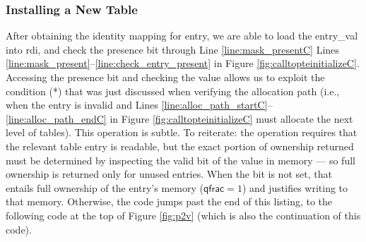  \subsubsection{Installing a New Table}
 After obtaining the identity mapping for \textsf{entry}, we are able to load the \textsf{entry\_val} into \textsf{rdi}, and check the presence bit through
\ifPLDI
Line \ref{line:mask_presentC} %
\else
Lines \ref{line:mask_present}--\ref{line:check_entry_present} 
\fi
in Figure \ref{fig:calltopteinitializeC}.
Accessing the presence bit and checking the value allows us to exploit the condition (*) that was just discussed when verifying the allocation
path (i.e., when the entry is invalid and Lines \ref{line:alloc_path_startC}--\ref{line:alloc_path_endC} in Figure \ref{fig:calltopteinitializeC}
must allocate the next level of tables).
This operation is subtle. To reiterate: the operation requires that the relevant table entry is readable, but the exact portion of ownership
returned must be determined by inspecting the valid bit of the value in memory --- so full ownership is returned only for unused entries.
When the bit is not set, that entails full ownership of the entry's memory ($\textsf{qfrac} = 1$) and justifies writing to that memory.
Otherwise, the code jumps past the end of this listing, to the following code at the top of Figure \ref{fig:p2v} (which is also the
continuation of this code).

